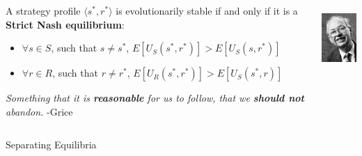 \documentclass[compress]{beamer}
\begin{document}
\begin{frame}{\cite{selten:1980}}
\begin{columns}[T]  
   \begin{column}{.75\textwidth}
      \begin{block}{}
	A strategy profile $\langle s^*, r^*\rangle$ is evolutionarily stable if and only if it is a \textbf{Strict Nash equilibrium}:
	\begin{itemize}
	    \item $\forall s \in S$, such that $s \neq s^*$, $E[U_S(s^*,r^*)] > E[U_S(s,r^*)]$
	    \item $\forall r \in R$, such that $r \neq r^*$, $E[U_R(s^*,r^*)] > E[U_S(s^*,r)]$
	\end{itemize}
      \end{block}
      \begin{block}{}
           \emph{Something that it is \textbf{reasonable} for us to follow, that we \textbf{should not} abandon.} -Grice
      \end{block}

    \end{column}
    \begin{column}{.2\textwidth}
	  \vspace{20pt}
	  \includegraphics[height=1in]{selten.jpg}   
     \end{column}
  \end{columns}
\end{frame}

\begin{frame}{Separating Equilibria}
\begin{center}

\end{center}
\end{frame}
\end{document}
